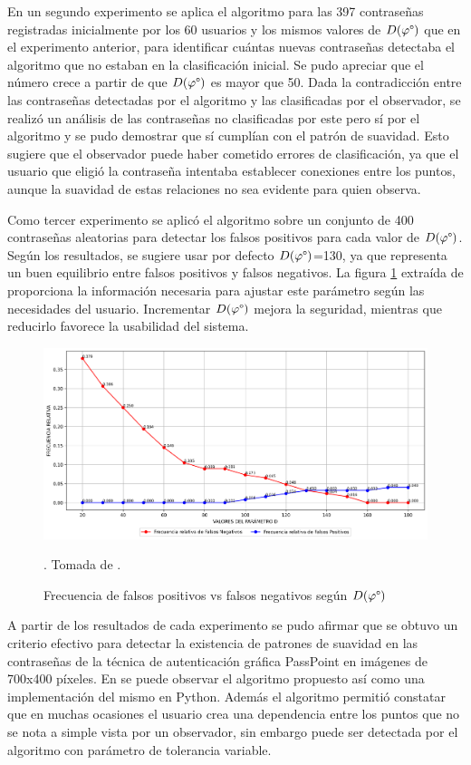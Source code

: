 \documentclass[12pt]{report}
\begin{document}
En un segundo experimento se aplica el algoritmo para las 397 contraseñas registradas inicialmente por los 60 usuarios y los mismos valores de $D(\varphi\degree)$ que en el experimento anterior, para identificar cuántas nuevas contraseñas detectaba el algoritmo que no estaban en la clasificación inicial. Se pudo apreciar que el número crece a partir de que $D(\varphi\degree)$ es mayor que 50\degree. Dada la contradicción entre las contraseñas detectadas por el algoritmo y las clasificadas por el observador, se realizó un análisis de las contraseñas no clasificadas por este pero sí por el algoritmo y se pudo demostrar que sí cumplían con el patrón de suavidad. Esto sugiere que el observador puede haber cometido errores de clasificación, ya que el usuario que eligió la contraseña intentaba establecer conexiones entre los puntos, aunque la suavidad de estas relaciones no sea evidente para quien observa.
 

Como tercer experimento se aplicó el algoritmo sobre un conjunto de 400 contraseñas aleatorias para detectar los falsos positivos para cada valor de $D(\varphi\degree)$. Según los resultados, se sugiere usar por defecto $D(\varphi\degree)$=130\degree, ya que representa un buen equilibrio entre falsos positivos y falsos negativos. La figura \ref{frecuencia}  extraída de \cite{3} proporciona la información necesaria para ajustar este parámetro según las necesidades del usuario. Incrementar $D(\varphi\degree)$ mejora la seguridad, mientras que reducirlo favorece la usabilidad del sistema.

\begin{figure}[ht]
	\centering
	\includegraphics[width=1\textwidth]{grafosviel.png}
	\caption{Frecuencia de falsos positivos vs falsos negativos según ${D(\varphi\degree)}$}. Tomada de \cite{3}.
	\label{frecuencia}
\end{figure}

A partir de los resultados de cada experimento se pudo afirmar que se obtuvo  un criterio efectivo para detectar la existencia de patrones de suavidad en las contraseñas de la técnica de autenticación gráfica PassPoint en imágenes de 700x400 píxeles. En \cite{3} se puede observar el algoritmo propuesto así como una implementación del mismo en Python. Además el algoritmo permitió constatar que en muchas ocasiones el usuario crea una dependencia entre los puntos que no se nota a simple vista por un observador, sin embargo puede ser detectada por el algoritmo con parámetro de tolerancia variable.
\end{document}
